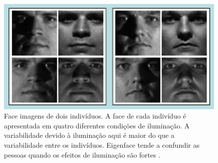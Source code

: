 	\begin{figure}[hbt]
		\begin{center}
			\includegraphics[width=14cm]{figuras/2.FundamentacaoTeorica/exemplosImagensIluminacaoo.png}
		\end{center}
		\caption{Face imagens de dois indivíduos. A face de cada indivíduo é apresentada em quatro diferentes condições de iluminação. A variabilidade devido à iluminação aqui é maior do que a variabilidade entre os indivíduos. Eigenface tende a confundir as pessoas quando os efeitos de iluminação são fortes \cite{hewitt}.}
		\label{exemplosImagensIluminacaoo}
	\end{figure}






